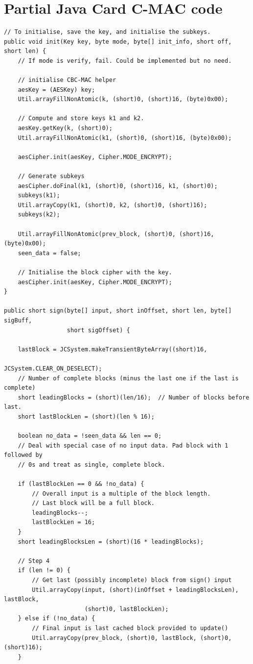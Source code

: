 \documentclass[12pt,a4paper]{article}
\begin{document}
\section{Partial Java Card C-MAC code}
\begin{verbatim}
// To initialise, save the key, and initialise the subkeys.
public void init(Key key, byte mode, byte[] init_info, short off, short len) {
    // If mode is verify, fail. Could be implemented but no need.

    // initialise CBC-MAC helper
    aesKey = (AESKey) key;
    Util.arrayFillNonAtomic(k, (short)0, (short)16, (byte)0x00);

    // Compute and store keys k1 and k2.
    aesKey.getKey(k, (short)0);
    Util.arrayFillNonAtomic(k1, (short)0, (short)16, (byte)0x00);

    aesCipher.init(aesKey, Cipher.MODE_ENCRYPT);

    // Generate subkeys
    aesCipher.doFinal(k1, (short)0, (short)16, k1, (short)0);
    subkeys(k1);
    Util.arrayCopy(k1, (short)0, k2, (short)0, (short)16);
    subkeys(k2);

    Util.arrayFillNonAtomic(prev_block, (short)0, (short)16, (byte)0x00);
    seen_data = false;

    // Initialise the block cipher with the key.
    aesCipher.init(aesKey, Cipher.MODE_ENCRYPT);
}

public short sign(byte[] input, short inOffset, short len, byte[] sigBuff, 
                  short sigOffset) {

    lastBlock = JCSystem.makeTransientByteArray((short)16, 
                                                JCSystem.CLEAR_ON_DESELECT);
    // Number of complete blocks (minus the last one if the last is complete)
    short leadingBlocks = (short)(len/16);  // Number of blocks before last.
    short lastBlockLen = (short)(len % 16);

    boolean no_data = !seen_data && len == 0;
    // Deal with special case of no input data. Pad block with 1 followed by
    // 0s and treat as single, complete block.

    if (lastBlockLen == 0 && !no_data) {
        // Overall input is a multiple of the block length.
        // Last block will be a full block.
        leadingBlocks--;
        lastBlockLen = 16;
    }
    short leadingBlocksLen = (short)(16 * leadingBlocks);

    // Step 4
    if (len != 0) {
        // Get last (possibly incomplete) block from sign() input
        Util.arrayCopy(input, (short)(inOffset + leadingBlocksLen), lastBlock,
                       (short)0, lastBlockLen);
    } else if (!no_data) {
        // Final input is last cached block provided to update()
        Util.arrayCopy(prev_block, (short)0, lastBlock, (short)0, (short)16);
    }
        

\end{verbatim}
\end{document}
